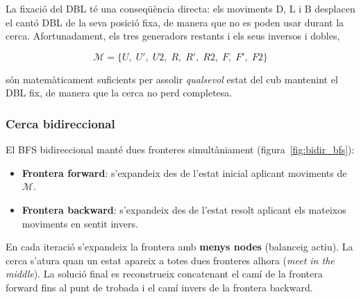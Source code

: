 \documentclass[12pt, a4paper]{article}
\begin{document}
La fixació del DBL té una conseqüència directa: els moviments D, L i B desplacen el cantó DBL de la seva posició fixa, de manera que no es poden usar durant la cerca. Afortunadament, els tres generadors restants i els seus inversos i dobles,

\begin{equation*}
  \mathcal{M} = \{U,\; U',\; U2,\; R,\; R',\; R2,\; F,\; F',\; F2\}
\end{equation*}

\noindent són matemàticament suficients per assolir \textit{qualsevol} estat del cub mantenint el DBL fix, de manera que la cerca no perd completesa.

\subsubsection{Cerca bidireccional}

El BFS bidireccional manté dues fronteres simultàniament (figura~\ref{fig:bidir_bfs}):

\begin{itemize}
  \item \textbf{Frontera forward}: s'expandeix des de l'estat inicial aplicant moviments de $\mathcal{M}$.
  \item \textbf{Frontera backward}: s'expandeix des de l'estat resolt aplicant els mateixos moviments en sentit invers.
\end{itemize}

En cada iteració s'expandeix la frontera amb \textbf{menys nodes} (balanceig actiu). La cerca s'atura quan un estat apareix a totes dues fronteres alhora (\textit{meet in the middle}). La solució final es reconstrueix concatenant el camí de la frontera forward fins al punt de trobada i el camí invers de la frontera backward.
\end{document}

